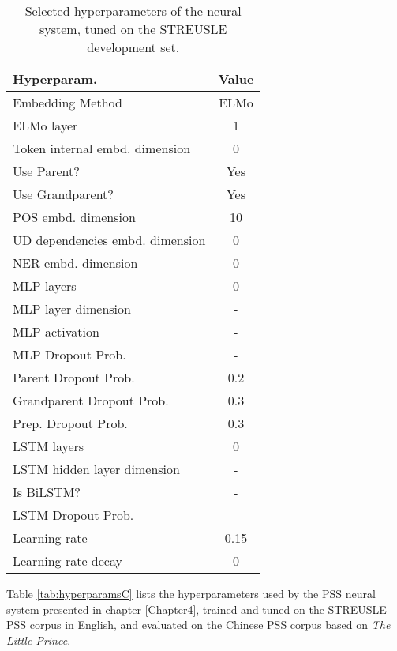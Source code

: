 
\begin{table}[h]
  \small
	\centering
	\begin{tabular}{@{}l|c@{}}
		\toprule
		Hyperparam. & Value \\
		\midrule
        Embedding Method & ELMo \\
        ELMo layer & 1 \\
        Token internal embd. dimension & 0 \\
        Use Parent? & Yes \\
        Use Grandparent? & Yes \\
        POS embd. dimension  & 10 \\
        UD dependencies embd. dimension  & 0 \\
        NER  embd. dimension  & 0 \\
        MLP layers  & 0 \\
        MLP layer dimension  & - \\
        MLP activation  & - \\
        MLP Dropout Prob.  & - \\
        Parent Dropout Prob. & 0.2 \\
        Grandparent Dropout Prob. & 0.3 \\
        Prep. Dropout Prob. & 0.3 \\
        LSTM layers  & 0 \\
        LSTM hidden layer dimension  & - \\
        Is BiLSTM? & - \\
        LSTM Dropout Prob.  & - \\
        Learning rate  & 0.15 \\
        Learning rate decay  & 0 \\
		\bottomrule
	\end{tabular}
	\caption{\label{tab:hyperparams}
        Selected hyperparameters of the neural system, tuned on the STREUSLE development set.
	}

\end{table}

Table \ref{tab:hyperparamsC} lists the hyperparameters used by the
PSS neural system presented in chapter \ref{Chapter4}, trained and tuned on the STREUSLE PSS corpus in English, and evaluated on the Chinese PSS corpus based on \textit{The Little Prince}.

